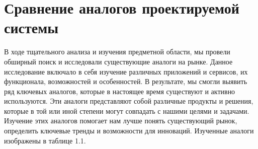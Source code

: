 \documentclass[14pt]{extreport}
\begin{document}
\chapter{Сравнение аналогов проектируемой системы}
    В ходе тщательного анализа и изучения предметной области, %
    мы провели обширный поиск и исследовали существующие аналоги %
    на рынке. Данное исследование включало в себя изучение различных приложений и %
    сервисов, их функционала, возможностей и особенностей. %
    В результате, мы смогли выявить ряд ключевых аналогов, %
    которые в настоящее время существуют и активно используются. %
    Эти аналоги представляют собой различные продукты и решения, %
    которые в той или иной степени могут совпадать с нашими целями %
    и задачами. Изучение этих аналогов помогает нам лучше понять %
    существующий рынок, определить ключевые тренды и возможности для %
    инноваций. Изученные аналоги изображены в таблице 1.1.
    
\end{document}
